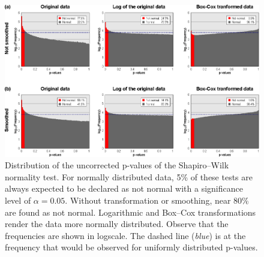 \begin{figure}[!p]  %
\centering
\includegraphics[width=14cm]{images/histograms.eps}
\caption[Results of the Shapiro--Wilk normality test.]{Distribution of the uncorrected p-values of the Shapiro--Wilk normality test. For normally distributed data, 5\% of these tests are always expected to be declared as not normal with a significance level of $\alpha=0.05$. Without transformation or smoothing, near 80\% are found as not normal. Logarithmic and Box--Cox transformations render the data more normally distributed. Observe that the frequencies are shown in logscale. The dashed line (\emph{blue}) is at the frequency that would be observed for uniformly distributed p-values.}
\label{fig:areal:histograms}
\end{figure}

